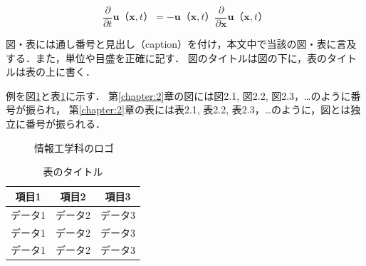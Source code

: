 \documentclass[a4j,12pt]{jreport}
\begin{document}


\begin{equation}\label{eq:uncalculated_pressure_before}
\frac{\partial}{\partial t}\bm{u} （\bm{x},t）  = -\bm{u} （\bm{x},t） \frac{\partial}{\partial \bm{x}}\bm{u} （\bm{x},t）
\end{equation} 


図・表には通し番号と見出し（caption）を付け，本文中で当該の図・表に言及する．また，単位や目盛を正確に記す．
図のタイトルは図の下に，表のタイトルは表の上に書く．

例を図\ref{fig:logo}と表\ref{tab:results}に示す．
第\ref{chapter:2}章の図には図2.1, 図2.2, 図2.3，…のように番号が振られ，
第\ref{chapter:2}章の表には表2.1, 表2.2, 表2.3，…のように，図とは独立に番号が振られる．


\begin{figure}[b]
    \centering
    \caption{情報工学科のロゴ}
    \label{fig:logo}
  \end{figure}


\begin {table}[t]
    \centering
  \caption{表のタイトル}
  \label{tab:results}
  \begin {tabular}{ccc} \hline
     項目1 & 項目2 & 項目3 \\ \hline
    データ1 & データ2 & データ3 \\
    データ1 & データ2 & データ3 \\
    データ1 & データ2 & データ3 \\ \hline
  \end {tabular}
\end {table}
\end{document}
